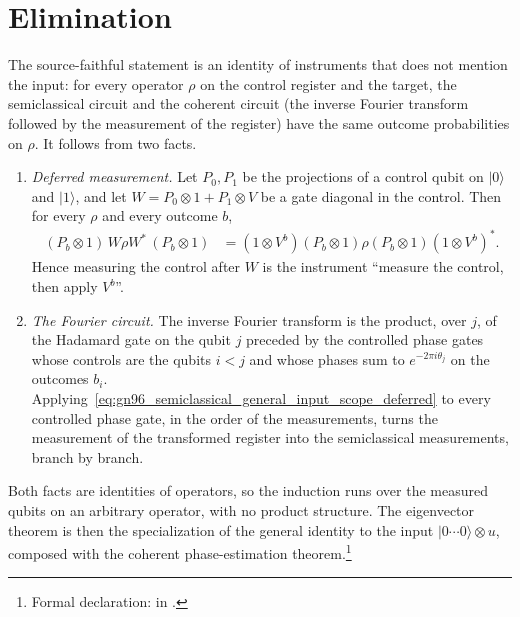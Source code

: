 \documentclass{article}
\begin{document}
\section{Elimination}
The source-faithful statement is an identity of instruments that does not
mention the input: for every operator $\rho$ on the control register and the
target, the semiclassical circuit and the coherent circuit (the inverse
Fourier transform followed by the measurement of the register) have the same
outcome probabilities on $\rho$. It follows from two facts.
\begin{enumerate}
    \item \emph{Deferred measurement.} Let $P_0,P_1$ be the projections of a
          control qubit on $\lvert0\rangle$ and $\lvert1\rangle$, and let
          $W=P_0\otimes1+P_1\otimes V$ be a gate diagonal in the control. Then
          for every $\rho$ and every outcome $b$,
          \begin{align}
              (P_b\otimes1)\,W\rho W^*\,(P_b\otimes1)
               & =(1\otimes V^b)(P_b\otimes1)\rho(P_b\otimes1)(1\otimes V^b)^*.
              \label{eq:gn96_semiclassical_general_input_scope_deferred}
          \end{align}
          Hence measuring the control after $W$ is the instrument
          ``measure the control, then apply $V^b$''.
    \item \emph{The Fourier circuit.} The inverse Fourier transform is the
          product, over $j$, of the Hadamard gate on the qubit $j$ preceded by
          the controlled phase gates whose controls are the qubits $i<j$ and
          whose phases sum to $e^{-2\pi i\theta_j}$ on the outcomes $b_i$.
          Applying~\eqref{eq:gn96_semiclassical_general_input_scope_deferred}
          to every controlled phase gate, in the order of the measurements,
          turns the measurement of the transformed register into the
          semiclassical measurements, branch by branch.
\end{enumerate}
Both facts are identities of operators, so the induction runs over the
measured qubits on an arbitrary operator, with no product structure. The
eigenvector theorem is then the specialization of the general identity to the
input $\lvert0\cdots0\rangle\otimes u$, composed with the coherent
phase-estimation theorem.\footnote{Formal declaration:
     in
    .}



\end{document}
